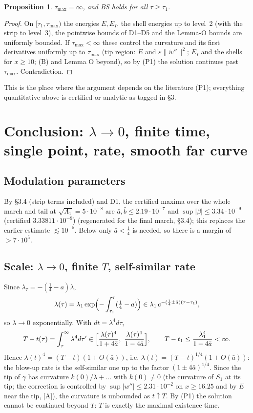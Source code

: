 \documentclass[11pt]{article}
\newtheorem{proposition}[theorem]{Proposition}
\theoremstyle{definition}
\theoremstyle{remark}
\newcommand{\tA}{\textsc{[A]}}
\newcommand{\norm}[1]{\lVert #1\rVert}
\begin{document}
\begin{proposition}\label{prop:global}
$\tau_{\max}=\infty$, and BS holds for all $\tau\ge\tau_1$.
\end{proposition}
\begin{proof}
On $[\tau_1,\tau_{\max})$ the energies $E,E_I$, the shell energies up to level~2 (with the strip to level~3), the pointwise bounds of D1--D5 and the Lemma-O bounds are uniformly bounded. If $\tau_{\max}<\infty$ these control the curvature and its first derivatives uniformly up to $\tau_{\max}$ (tip region: $E$ and $\varepsilon\norm{\tilde w''}^2$; $E_I$ and the shells for $x\ge10$; (B) and Lemma O beyond), so by (P1) the solution continues past $\tau_{\max}$. Contradiction.
\end{proof}
\noindent This is the place where the argument depends on the literature (P1); everything quantitative above is certified or analytic as tagged in \S3.

\section{Conclusion: $\lambda\to0$, finite time, single point, rate, smooth far curve}

\subsection{Modulation parameters}
By \S3.4 (strip terms included) and D1, the certified maxima over the whole march and tail at $\sqrt{\Lambda_1}=5\cdot10^{-8}$ are $\bar a,\bar b\le2.19\cdot10^{-7}$ and $\sup|\beta|\le3.34\cdot10^{-9}$ (certified $3.33811\cdot10^{-9}$) (regenerated for the final march, \S3.4); this replaces the earlier estimate $\lesssim10^{-5}$. Below only $\bar a<\tfrac14$ is needed, so there is a margin of $>7\cdot10^5$.

\subsection{Scale: $\lambda\to0$, finite $T$, self-similar rate}
Since $\lambda_\tau=-(\tfrac14-a)\lambda$,
\[
\lambda(\tau)=\lambda_1\exp\Bigl(-\int_{\tau_1}^{\tau}(\tfrac14-a)\Bigr)\in\lambda_1\,e^{-(\frac14\pm\bar a)(\tau-\tau_1)} ,
\]
so $\lambda\to0$ exponentially. With $dt=\lambda^4d\tau$,
\[
T-t(\tau)=\int_\tau^\infty\lambda^4d\tau'\in\Bigl[\frac{\lambda(\tau)^4}{1+4\bar a},\ \frac{\lambda(\tau)^4}{1-4\bar a}\Bigr],\qquad T-t_1\le\frac{\lambda_1^4}{1-4\bar a}<\infty .
\]
Hence $\lambda(t)^4=(T-t)(1+O(\bar a))$, i.e. $\lambda(t)=(T-t)^{1/4}(1+O(\bar a))$: the blow-up rate is the self-similar one up to the factor $(1\pm4\bar a)^{1/4}$. Since the tip of $\gamma$ has curvature $k(0)/\lambda+\ldots$ with $k(0)\neq0$ (the curvature of $S_1$ at its tip; the correction is controlled by $\sup|w''|\le2.31\cdot10^{-2}$ on $x\ge16.25$ and by $E$ near the tip, \tA), the curvature is unbounded as $t\uparrow T$. By (P1) the solution cannot be continued beyond $T$: $T$ is exactly the maximal existence time.
\end{document}
